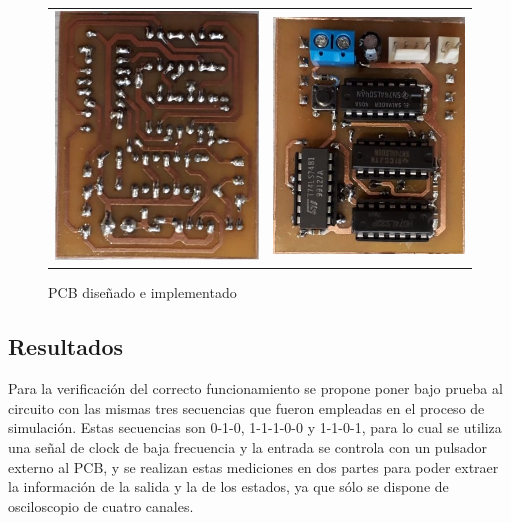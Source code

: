 \begin{figure}[H]
\begin{tabular}{c c}
        \includegraphics[scale=0.6]{../EJ2/Recursos/pcb_bottom.jpeg} & 
        \includegraphics[scale=0.6]{../EJ2/Recursos/pcb_top.jpeg} \\
    \end{tabular}
    \caption{PCB dise\~nado e implementado}
\end{figure}

\subsection{Resultados}
Para la verificaci\'on del correcto funcionamiento se propone poner bajo prueba al circuito con las mismas tres secuencias que fueron empleadas
en el proceso de simulaci\'on. Estas secuencias son 0-1-0, 1-1-1-0-0 y 1-1-0-1, para lo cual se utiliza una se\~nal de clock de baja frecuencia y la
entrada se controla con un pulsador externo al PCB, y se realizan estas mediciones en dos partes para poder extraer la informaci\'on de la salida y la de los estados,
ya que s\'olo se dispone de osciloscopio de cuatro canales.

